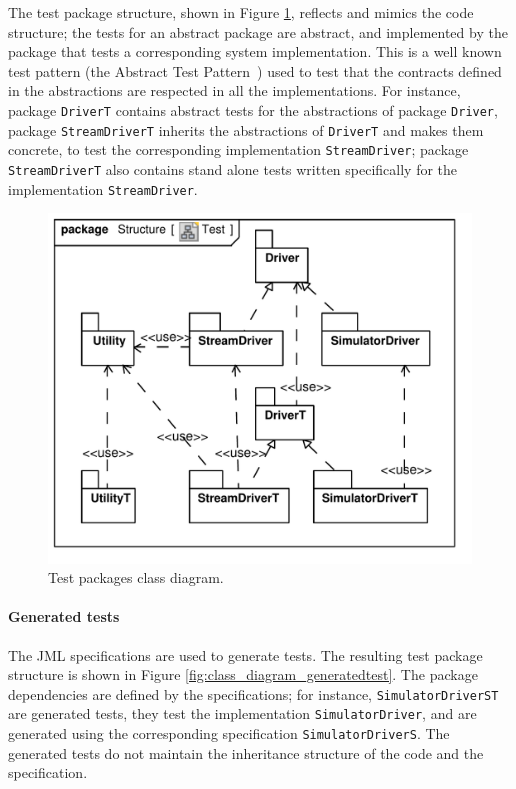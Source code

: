 \documentclass{article}
\newcommand{\lil}[1]{\texttt{\lstinline|#1|}}
\begin{document}
The test package structure, shown in Figure \ref{fig:class_diagram_test}, reflects and mimics the code structure; the tests for an abstract package are abstract, and implemented by the package that tests a corresponding system implementation. 
This is a well known test pattern (the Abstract Test Pattern~\cite{Thomas2004}) used to test that the contracts defined in the abstractions are respected in all the implementations.  
For instance, package \lil{DriverT} contains abstract tests for the abstractions of package \lil{Driver}, package \lil{StreamDriverT} inherits the abstractions of \lil{DriverT} and makes them concrete, to test the corresponding implementation \lil{StreamDriver}; package \lil{StreamDriverT} also contains stand alone tests written specifically for the implementation \lil{StreamDriver}.

\begin{figure}[htb!]
  \centering
  \includegraphics[scale=0.4]{UML_model/Class_Diagram__Structure__Test}
  \caption{Test packages class diagram.}
  \label{fig:class_diagram_test}
\end{figure}

\paragraph*{Generated tests}

The JML specifications are used to generate tests.
The resulting test package structure is shown in Figure \ref{fig:class_diagram_generatedtest}.  
The package dependencies are defined by the specifications; for instance, \lil{SimulatorDriverST} are generated tests, they test the implementation \lil{SimulatorDriver}, and are generated using the corresponding specification \lil{SimulatorDriverS}.  
The generated tests do not maintain the inheritance structure of the code and the specification.
\end{document}
